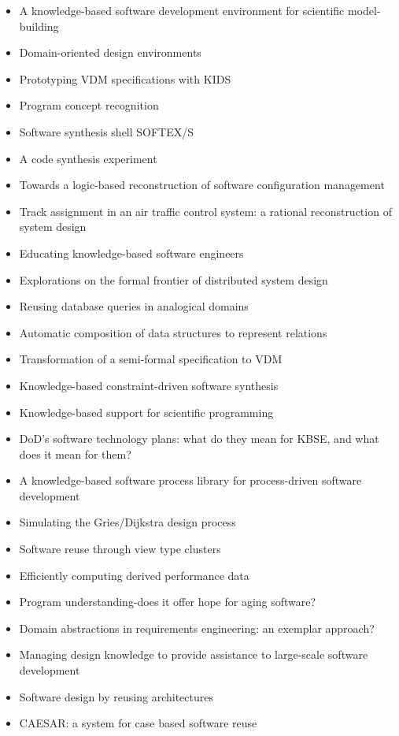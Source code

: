 {\small
\begin{itemize}[itemsep=-1ex]
  \item A knowledge-based software development environment for scientific model-building
  \item Domain-oriented design environments
  \item Prototyping VDM specifications with KIDS
  \item Program concept recognition
  \item Software synthesis shell SOFTEX/S
  \item A code synthesis experiment
  \item Towards a logic-based reconstruction of software configuration management
  \item Track assignment in an air traffic control system: a rational reconstruction of system design
  \item Educating knowledge-based software engineers
  \item Explorations on the formal frontier of distributed system design
  \item Reusing database queries in analogical domains
  \item Automatic composition of data structures to represent relations
  \item Transformation of a semi-formal specification to VDM
  \item Knowledge-based constraint-driven software synthesis
  \item Knowledge-based support for scientific programming
  \item DoD's software technology plans: what do they mean for KBSE, and what does it mean for them?
  \item A knowledge-based software process library for process-driven software development
  \item Simulating the Gries/Dijkstra design process
  \item Software reuse through view type clusters
  \item Efficiently computing derived performance data
  \item Program understanding-does it offer hope for aging software?
  \item Domain abstractions in requirements engineering: an exemplar approach?
  \item Managing design knowledge to provide assistance to large-scale software development
  \item Software design by reusing architectures
  \item CAESAR: a system for case based software reuse
\end{itemize}
}

